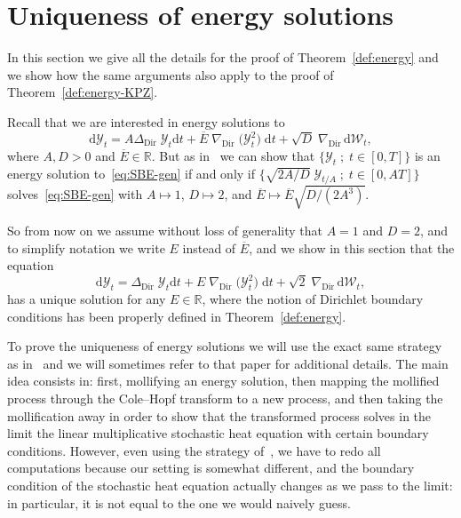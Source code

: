 \documentclass[AHL,Unicode,longabstracts]{cedram}
\DeclareMathOperator{\Dir}{Dir}
\newcommand{\bb}[1]{{\mathbb #1}}
\newcommand{\RR}{\mathbb R}
\newcommand{\mc}[1]{{\mathcal #1}}
\renewcommand{\mc}[1]{{\mathcal #1}}
\renewcommand{\bar}{\overline}
\newcommand*{\dd}{\mathrm{d}}
\newcommand*{\dt}{\dd t}
\begin{document}
\section{Uniqueness of energy solutions}\label{sec:energy-pr}

In this section we give all the details for the proof of Theorem~\ref{def:energy} and we show how the same arguments also apply to the proof of Theorem~\ref{def:energy-KPZ}.

Recall that we are interested in energy solutions to
\begin{equation}\label{eq:SBE-gen}
\dd\mathcal Y_t = A \Delta_{\Dir}\; \mathcal Y_t \dt + \bar{E}\;\nabla_{\Dir}\; \big(\mathcal{Y}_t^2 \big) \;\dt + \sqrt{D}\; \nabla_{\Dir}\,\dd\mc W_t,
\end{equation}
where $A, D>0$ and $\bar{E} \in \RR$. But as in~\cite[Remark~2.6]{Gubinelli2015Energy} we can show that $\{\mathcal Y_t \; ; \; t \in [0,T] \}$ is an energy solution to~\eqref{eq:SBE-gen} if and only if $\big\{\sqrt{2A/D} \; \mathcal Y_{t/A} \; ;\; t \in [0, A T]\big\}$ solves~\eqref{eq:SBE-gen} with $A \mapsto 1$, $D \mapsto 2$, and $ \bar{E} \mapsto \bar{E} \sqrt{D/(2A^3)}$.


So from now on we assume without loss of generality that $A = 1$ and $D=2$, and to simplify notation we write $E$ instead of $\bar{E}$, and we show in this section that the equation
\begin{equation}\label{eq:SBE-gen2}
\dd\mathcal Y_t = \Delta_{\Dir}\; \mathcal Y_t \dt + E\;\nabla_{\Dir}\; \big(\mathcal{Y}_t^2 \big) \;\dt + \sqrt{2}\; \nabla_{\Dir}\,\dd\mc W_t,
\end{equation}
has a unique solution for any $E\in\bb R$, where the notion of Dirichlet boundary conditions has been properly defined in Theorem~\ref{def:energy}.

To prove the uniqueness of energy solutions we will use the exact same strategy as in~\cite{Gubinelli2015Energy} and we will sometimes refer to that paper for additional details. The main idea consists in: first, mollifying an energy solution, then mapping the mollified process through the Cole--Hopf transform to a new process, and then taking the mollification away in order to show that the transformed process solves in the limit the linear multiplicative stochastic heat equation with certain boundary conditions. However, even using the strategy of~\cite{Gubinelli2015Energy}, we have to redo all computations because our setting is somewhat different, and the boundary condition of the stochastic heat equation actually changes as we pass to the limit: in particular, it is not equal to the one we would naively guess.
\end{document}
